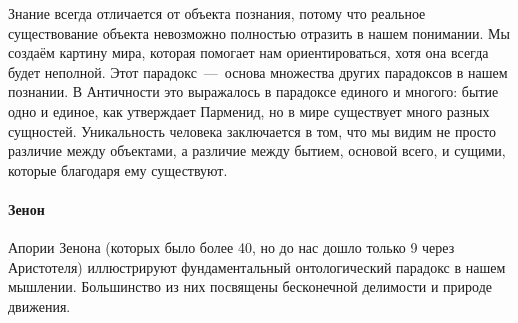 
Знание всегда отличается от объекта познания, потому что реальное существование объекта невозможно полностью отразить в нашем понимании. Мы создаём картину мира, которая помогает нам ориентироваться, хотя она всегда будет неполной. Этот парадокс~---~основа множества других парадоксов в нашем познании. В Античности это выражалось в парадоксе единого и многого: бытие одно и единое, как утверждает Парменид, но в мире существует много разных сущностей. Уникальность человека заключается в том, что мы видим не просто различие между объектами, а различие между бытием, основой всего, и сущими, которые благодаря ему существуют.

\paragraph{Зенон}
Апории Зенона (которых было более 40, но до нас дошло только 9 через Аристотеля) иллюстрируют фундаментальный онтологический парадокс в нашем мышлении. Большинство из них посвящены бесконечной делимости и природе движения.



